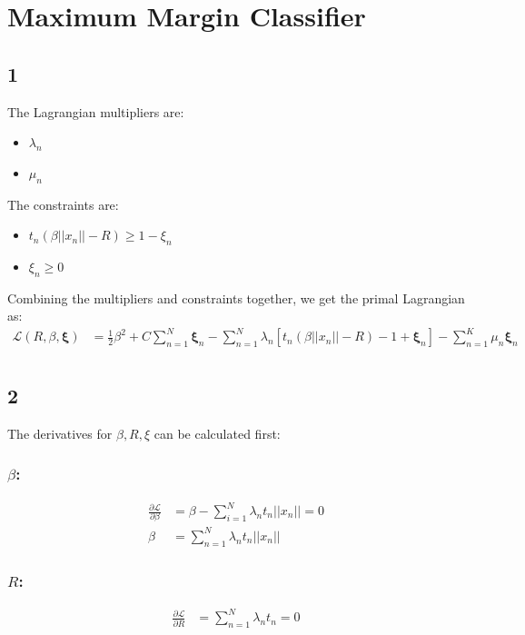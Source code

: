 \documentclass[a4paper]{article}
\begin{document}
\section*{Maximum Margin Classifier}
\subsection*{1}
The Lagrangian multipliers are:
\begin{itemize}
    \item ${\lambda_{n}} $
    \item ${\mu_{n}}$
\end{itemize}

The constraints are:
\begin{itemize}
    \item $t_{n}(\beta||x_{n}|| - R) \geq 1 - \xi_{n}$
    \item $\xi_{n} \geq 0$
\end{itemize}

Combining the multipliers and constraints together, we get the primal Lagrangian as:
\begin{align*}
    \mathcal{L}(R, \beta, \pmb{\xi}) &= \frac{1}{2}\beta^{2} + C\sum_{n=1}^{N}\pmb{\xi}_{n} - \sum_{n=1}^{N}\lambda_{n}[t_{n}(\beta||x_{n}|| - R) - 1 + \pmb{\xi}_{n}] - \sum_{n=1}^{K}\mu_{n}\pmb{\xi}_{n}\\
\end{align*}

\subsection*{2}
The derivatives for $\beta, R, \xi$ can be calculated first:

\subsubsection*{$\beta$:}
\begin{align*}
    \frac{\partial \mathcal{L}}{\partial \beta} &= \beta - \sum_{i=1}^{N}\lambda_{n}t_{n}||x_{n}|| = 0 \\
    \beta &= \sum_{n=1}^{N}\lambda_{n}t_{n}||x_{n}||
\end{align*}

\subsubsection*{$R$:}
\begin{align*}
    \frac{\partial \mathcal{L}}{\partial R} &= \sum_{n=1}^{N}\lambda_{n}t_{n} = 0
\end{align*}
\end{document}

